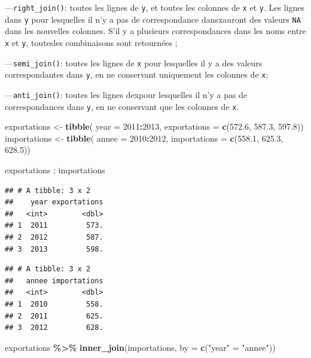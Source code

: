 \documentclass[
  11pt,
]{book}
\newenvironment{Shaded}{\begin{snugshade}}{\end{snugshade}}
\newcommand{\DataTypeTok}[1]{\textcolor[rgb]{0.13,0.29,0.53}{#1}}
\newcommand{\DecValTok}[1]{\textcolor[rgb]{0.00,0.00,0.81}{#1}}
\newcommand{\FloatTok}[1]{\textcolor[rgb]{0.00,0.00,0.81}{#1}}
\newcommand{\KeywordTok}[1]{\textcolor[rgb]{0.13,0.29,0.53}{\textbf{#1}}}
\newcommand{\NormalTok}[1]{#1}
\newcommand{\OperatorTok}[1]{\textcolor[rgb]{0.81,0.36,0.00}{\textbf{#1}}}
\newcommand{\StringTok}[1]{\textcolor[rgb]{0.31,0.60,0.02}{#1}}
\numberwithin{equation}{section}
\numberwithin{countremarque}{section}
\begin{document}
---\texttt{right\_join()}: toutes les lignes de \texttt{y}, et toutes les colonnes de \texttt{x} et \texttt{y}. Les lignes dans \texttt{y} pour lesquelles il n'y a pas de correspondance dansxauront des valeurs \texttt{NA} dans les nouvelles colonnes. S'il y a plusieurs correspondances dans les noms entre \texttt{x} et \texttt{y}, toutesles combinaisons sont retournées ;

---\texttt{semi\_join()}: toutes les lignes de \texttt{x} pour lesquelles il y a des valeurs correspondantes dans \texttt{y}, en ne conservant uniquement les colonnes de \texttt{x};

---\texttt{anti\_join()}: toutes les lignes dexpour lesquelles il n'y a pas de correspondances dans \texttt{y}, en ne conservant que les colonnes de \texttt{x}.

\begin{Shaded}
\begin{Highlighting}[]
\NormalTok{exportations \textless{}{-}}\StringTok{ }\KeywordTok{tibble}\NormalTok{(}
  \DataTypeTok{year =} \DecValTok{2011}\OperatorTok{:}\DecValTok{2013}\NormalTok{, }
  \DataTypeTok{exportations =} \KeywordTok{c}\NormalTok{(}\FloatTok{572.6}\NormalTok{, }\FloatTok{587.3}\NormalTok{, }\FloatTok{597.8}\NormalTok{))}
\NormalTok{importations \textless{}{-}}\StringTok{ }\KeywordTok{tibble}\NormalTok{(}
  \DataTypeTok{annee =} \DecValTok{2010}\OperatorTok{:}\DecValTok{2012}\NormalTok{,}
  \DataTypeTok{importations =} \KeywordTok{c}\NormalTok{(}\FloatTok{558.1}\NormalTok{, }\FloatTok{625.3}\NormalTok{, }\FloatTok{628.5}\NormalTok{))}

\NormalTok{exportations ; importations}
\end{Highlighting}
\end{Shaded}

\begin{lstlisting}
## # A tibble: 3 x 2
##    year exportations
##   <int>        <dbl>
## 1  2011         573.
## 2  2012         587.
## 3  2013         598.
\end{lstlisting}

\begin{lstlisting}
## # A tibble: 3 x 2
##   annee importations
##   <int>        <dbl>
## 1  2010         558.
## 2  2011         625.
## 3  2012         628.
\end{lstlisting}

\begin{Shaded}
\begin{Highlighting}[]
\NormalTok{exportations }\OperatorTok{\%\textgreater{}\%}\StringTok{ }\KeywordTok{inner\_join}\NormalTok{(importations, }\DataTypeTok{by =} \KeywordTok{c}\NormalTok{(}\StringTok{"year"}\NormalTok{ =}\StringTok{ "annee"}\NormalTok{))}
\end{Highlighting}
\end{Shaded}
\end{document}
